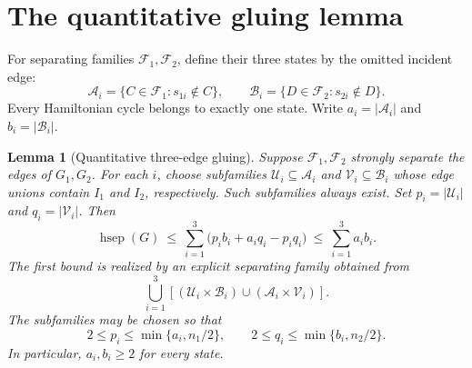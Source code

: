 \documentclass[10pt]{article}
\newtheorem{lemma}{Lemma}
\newcommand{\hsep}{\operatorname{hsep}}
\begin{document}
\section{The quantitative gluing lemma}
For separating families $\mathcal F_1,\mathcal F_2$, define their three states
by the omitted incident edge:
\[
 \mathcal A_i=\{C\in\mathcal F_1:s_{1i}\notin C\},\qquad
 \mathcal B_i=\{D\in\mathcal F_2:s_{2i}\notin D\}.
\]
Every Hamiltonian cycle belongs to exactly one state. Write
$a_i=|\mathcal A_i|$ and $b_i=|\mathcal B_i|$.

\begin{samepage}
\begin{lemma}[Quantitative three-edge gluing]\label{lem:splice}
Suppose $\mathcal F_1,\mathcal F_2$ strongly separate the edges of $G_1,G_2$.
For each $i$, choose subfamilies
$\mathcal U_i\subseteq\mathcal A_i$ and
$\mathcal V_i\subseteq\mathcal B_i$ whose edge unions contain $I_1$ and $I_2$,
respectively. Such subfamilies always exist. Set $p_i=|\mathcal U_i|$ and
$q_i=|\mathcal V_i|$. Then
\begin{equation}\label{eq:refined}
 \hsep(G)\ \le\ \sum_{i=1}^3
       \bigl(p_i b_i+a_i q_i-p_iq_i\bigr)
 \ \le\ \sum_{i=1}^3 a_i b_i.
\end{equation}
The first bound is realized by an explicit separating family obtained from
\begin{equation}\label{eq:pairs}
 \bigcup_{i=1}^3
 \left[(\mathcal U_i\times\mathcal B_i)
       \cup(\mathcal A_i\times\mathcal V_i)\right].
\end{equation}
The subfamilies may be chosen so that
\begin{equation}\label{eq:statecovers}
 2\le p_i\le\min\{a_i,n_1/2\},\qquad
 2\le q_i\le\min\{b_i,n_2/2\}.
\end{equation}
In particular, $a_i,b_i\ge2$ for every state.
\end{lemma}
\end{samepage}
\end{document}
